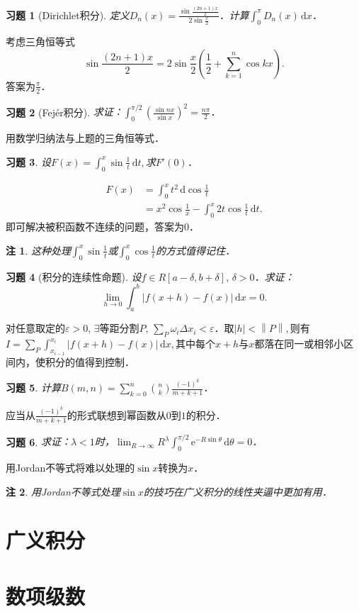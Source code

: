 \documentclass[11pt,a4paper]{ctexart}
\makeatletter
\theoremstyle{thmseries} %
\theoremstyle{exerseries}
\newtheorem{exer}{习题}[section]
\newtheorem*{rem}{注}
\renewenvironment{proof}[1][\proofname]{\par
  \pushQED{\qed}%
  \normalfont \topsep6\p@\@plus6\p@\relax
  \trivlist
  \item[\hskip\labelsep
        \itshape
    #1\@addpunct{}]\ignorespaces
}{%
  \popQED\endtrivlist\@endpefalse
}
\newenvironment{sol}{\begin{proof}[\bfseries\upshape 解\quad]}{\end{proof}}
\newenvironment{pf}{\begin{proof}[\bfseries\upshape 证\quad]}{\end{proof}}
\newcommand{\bra}[1]{\mathopen{}\left(#1\right)}
\renewcommand{\epsilon}{\varepsilon}
\renewcommand{\d}{\mathrm{d}}
\newcommand{\e}{\mathrm{e}}
\newcommand{\norm}[1]{\left\lVert #1 \right\rVert}
\makeatother
\begin{document}
\begin{exer}[Dirichlet积分]
	定义$D_n(x)=\frac{\sin\frac{(2n+1)x}{2}}{2\sin\frac{x}{2}}$．计算$\int_{0}^{\pi}D_n(x)\,\d x$．
\end{exer}
\begin{sol}
	考虑三角恒等式
	\[\sin\frac{(2n+1)x}{2}=2\sin\frac{x}{2}\bra{\frac{1}{2}+\sum_{k=1}^{n}\cos kx}.\]
	答案为$\frac{\pi}{2}$．
\end{sol}

\begin{exer}[Fejér积分]
	求证：$\int_{0}^{\pi/2}\bra{\frac{\sin nx}{\sin x}}^2=\frac{n\pi}{2}$．
\end{exer}
\begin{pf}
	用数学归纳法与上题的三角恒等式．
\end{pf}

\begin{exer}
	设$F(x)=\int_{0}^{x}\sin\frac{1}{t}\,\d t,$求$F'(0)$．
\end{exer}
\begin{sol}
	\begin{align*}
		F(x)&=\int_{0}^{x}t^2\,\d\cos\frac{1}{t}\\
		&=x^2\cos\frac{1}{x}-\int_{0}^{x}2t\cos\frac{1}{t}\,\d t.
	\end{align*}
	即可解决被积函数不连续的问题，答案为$0$．
\end{sol}
\begin{rem}
	这种处理$\int_{0}^{x}\sin\frac{1}{t}$或$\int_{0}^{x}\cos\frac{1}{t}$的方式值得记住．
\end{rem}

\begin{exer}[积分的连续性命题]
	设$f\in R[a-\delta,b+\delta],\,\delta>0$．求证：
	\[\lim_{h\to0}\int_{a}^{b}|f(x+h)-f(x)|\,\d x=0.\]
\end{exer}
\begin{pf}
	对任意取定的$\epsilon>0,\,\exists$等距分割$P,\,\sum_{P}\omega_i\Delta x_i<\epsilon$．取$|h|<\norm{P},$则有
	$I=\sum_{P}\int_{x_{i-1}}^{x_i}|f(x+h)-f(x)|\,\d x,$其中每个$x+h$与$x$都落在同一或相邻小区间内，使积分的值得到控制．
\end{pf}

\begin{exer}
	计算$B(m,n)=\sum_{k=0}^{n}\binom{n}{k}\frac{(-1)^k}{m+k+1}$．
\end{exer}
\begin{sol}
	应当从$\frac{(-1)^k}{m+k+1}$的形式联想到幂函数从$0$到$1$的积分．
\end{sol}

\begin{exer}
	求证：$\lambda<1$时，$\lim_{R\to\infty}R^\lambda\int_{0}^{\pi/2}\e^{-R\sin\theta}\,\d\theta=0$．
\end{exer}
\begin{pf}
	用Jordan不等式将难以处理的$\sin x$转换为$x$．
\end{pf}
\begin{rem}
	用Jordan不等式处理$\sin x$的技巧在广义积分的线性夹逼中更加有用．
\end{rem}



\section{广义积分}


\section{数项级数}
\end{document}
